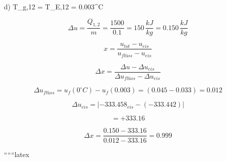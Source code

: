 d) \quad T_{g,12} = T_{E,12} = 0.003^\circ C
\]

\[
\Delta u = \frac{Q_{1,2}}{m} = \frac{1500}{0.1} = 150 \, \frac{kJ}{kg} = 0.150 \, \frac{kJ}{kg}
\]

\[
x = \frac{u_{tot} - u_{eis}}{u_{flüss} - u_{eis}}
\]

\[
\Delta x = \frac{\Delta u - \Delta u_{eis}}{\Delta u_{flüss} - \Delta u_{eis}}
\]

\[
\Delta u_{flüss} = u_f(0^\circ C) - u_f(0.003) = (0.045 - 0.033) = 0.012
\]

\[
\Delta u_{eis} = | -333.458_{eis} - (-333.442) |
\]

\[
= + 333.16
\]

\[
\Delta x = \frac{0.150 - 333.16}{0.012 - 333.16} = 0.999
\]

``````latex
